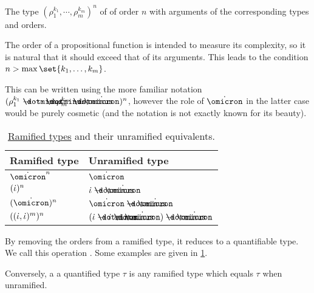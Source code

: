 \begin{definition}
\begin{thmenum}
\begin{thmenum}
       The type \( (\rho_1^{k_1}, \cdots, \rho_m^{k_m})^n \) of  of order \( n \) with arguments of the corresponding types and orders.

      The order of a propositional function is intended to measure its complexity, so it is natural that it should exceed that of its arguments. This leads to the condition \( n > \max\set{ k_1, \ldots, k_m } \).

      This can be written using the more familiar notation \( (\rho_1^{k_1} \synimplies \cdots \synimplies \rho_m^{k_m} \synimplies \syn\omicron)^n \), however the role of \( \syn\omicron \) in the latter case would be purely cosmetic (and the notation is not exactly known for its beauty).
    \end{thmenum}

    \begin{table}
      \begin{center}
        \begin{tabular}{l l}
          \toprule
          Ramified type                      & Unramified type \\
          \midrule
          \( \syn\omicron^n \)               & \( \syn\omicron \) \\
          \( (\dot{\iota})^n \)                & \( \syn\iota \synimplies \syn\omicron \) \\
          \( (\syn\omicron)^n \)             & \( \syn\omicron \synimplies \syn\omicron \) \\
          \( ((\dot{\iota}, \dot{\iota})^m)^n \) & \( (\syn\iota \synimplies \syn\iota \synimplies \syn\omicron)  \synimplies \syn\omicron \) \\
          \bottomrule
        \end{tabular}
      \end{center}

      \caption{\hyperref[def:ramified_theory_of_types/ramified_type]{Ramified types} and their unramified equivalents.}\label{tab:def:ramified_theory_of_types/ramified_type}
    \end{table}

    By removing the orders from a ramified type, it reduces to a quantifiable type. We call this operation . Some examples are given in \cref{tab:def:ramified_theory_of_types/ramified_type}.

    Conversely, a  a quantified type \( \tau \) is any ramified type which equals \( \tau \) when unramified.


\end{thmenum}
\end{definition}
